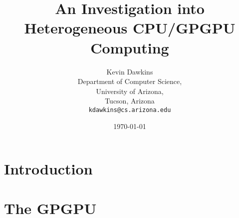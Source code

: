 \documentclass[12pt,notitlepage]{report}
\begin{document}
\title{An Investigation into Heterogeneous CPU/GPGPU Computing}
\author{Kevin Dawkins\\
  Department of Computer Science,\\
  University of Arizona,\\
  Tucson, Arizona\\
  \texttt{kdawkins@cs.arizona.edu}}
\date{\today}
\maketitle



\tableofcontents

\chapter*{Introduction}


\chapter*{The GPGPU}




\nocite{linearalg, emergingtech, nvidia, memcached}



\end{document}
